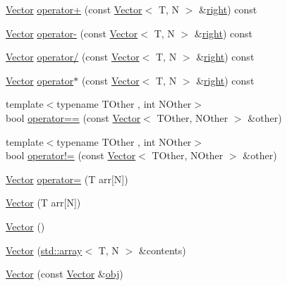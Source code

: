 \begin{DoxyCompactItemize}
\item 
\hyperlink{classmc_1_1_vector}{Vector} \hyperlink{classmc_1_1_vector_a41f3ca26b2d43a91797df7499afcc5c5}{operator+} (const \hyperlink{classmc_1_1_vector}{Vector}$<$ T, N $>$ \&\hyperlink{_s_d_l__opengl__glext_8h_a5ffadbbacc6b89cf6218bc43b384d3fe}{right}) const 
\item 
\hyperlink{classmc_1_1_vector}{Vector} \hyperlink{classmc_1_1_vector_ac486a0798fd812967cb543c23bf60e3b}{operator-\/} (const \hyperlink{classmc_1_1_vector}{Vector}$<$ T, N $>$ \&\hyperlink{_s_d_l__opengl__glext_8h_a5ffadbbacc6b89cf6218bc43b384d3fe}{right}) const 
\item 
\hyperlink{classmc_1_1_vector}{Vector} \hyperlink{classmc_1_1_vector_a5760307dcf1bbc6ecbf4e576dc5c4838}{operator/} (const \hyperlink{classmc_1_1_vector}{Vector}$<$ T, N $>$ \&\hyperlink{_s_d_l__opengl__glext_8h_a5ffadbbacc6b89cf6218bc43b384d3fe}{right}) const 
\item 
\hyperlink{classmc_1_1_vector}{Vector} \hyperlink{classmc_1_1_vector_a64037e6603bb0f6997d1c2d22de2a4c9}{operator$\ast$} (const \hyperlink{classmc_1_1_vector}{Vector}$<$ T, N $>$ \&\hyperlink{_s_d_l__opengl__glext_8h_a5ffadbbacc6b89cf6218bc43b384d3fe}{right}) const 
\item 
{\footnotesize template$<$typename T\+Other , int N\+Other$>$ }\\bool \hyperlink{classmc_1_1_vector_a2f324924de53bc758f94df7b7b4e339b}{operator==} (const \hyperlink{classmc_1_1_vector}{Vector}$<$ T\+Other, N\+Other $>$ \&other)
\item 
{\footnotesize template$<$typename T\+Other , int N\+Other$>$ }\\bool \hyperlink{classmc_1_1_vector_aa45600b2bcd72732feb2f24d6c3e9ef6}{operator!=} (const \hyperlink{classmc_1_1_vector}{Vector}$<$ T\+Other, N\+Other $>$ \&other)
\item 
\hyperlink{classmc_1_1_vector}{Vector} \hyperlink{classmc_1_1_vector_af8000128edbd58d1790f23697501cd9d}{operator=} (T arr\mbox{[}N\mbox{]})
\item 
\hyperlink{classmc_1_1_vector_a05aed259e7ff40b4e6639f7dda5886cd}{Vector} (T arr\mbox{[}N\mbox{]})
\item 
\hyperlink{classmc_1_1_vector_a7c2fa3ae75ebb6d155aa3e3aa140ce09}{Vector} ()
\item 
\hyperlink{classmc_1_1_vector_a18dc923904b1d0511a9b9eefa72e8cb6}{Vector} (\hyperlink{_s_d_l__opengl__glext_8h_a52f38e7d822a46377fde7a02708eedb1}{std\+::array}$<$ T, N $>$ \&contents)
\item 
\hyperlink{classmc_1_1_vector_a9cd50db0b1a697ff4368a1072e99182d}{Vector} (const \hyperlink{classmc_1_1_vector}{Vector} \&\hyperlink{_s_d_l__opengl__glext_8h_a0c0d4701a6c89f4f7f0640715d27ab26}{obj})
\end{DoxyCompactItemize}
